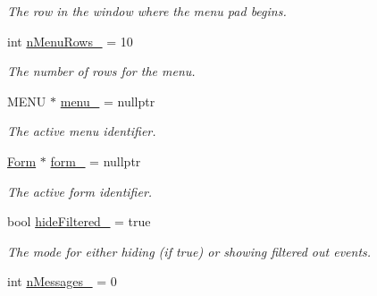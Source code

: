 \begin{DoxyCompactItemize}
\begin{DoxyCompactList}\small\item\em The row in the window where the menu pad begins. \end{DoxyCompactList}\item 
int \hyperlink{structslb_1_1core_1_1ui_1_1LogWindow_a7ebb18c261f95f0212997c48ae98878e}{n\+Menu\+Rows\+\_\+} = 10\hypertarget{structslb_1_1core_1_1ui_1_1LogWindow_a7ebb18c261f95f0212997c48ae98878e}{}\label{structslb_1_1core_1_1ui_1_1LogWindow_a7ebb18c261f95f0212997c48ae98878e}

\begin{DoxyCompactList}\small\item\em The number of rows for the menu. \end{DoxyCompactList}\item 
M\+E\+NU $\ast$ \hyperlink{structslb_1_1core_1_1ui_1_1LogWindow_a3fcd52c1d0ee725005b353fca1568f2f}{menu\+\_\+} = nullptr\hypertarget{structslb_1_1core_1_1ui_1_1LogWindow_a3fcd52c1d0ee725005b353fca1568f2f}{}\label{structslb_1_1core_1_1ui_1_1LogWindow_a3fcd52c1d0ee725005b353fca1568f2f}

\begin{DoxyCompactList}\small\item\em The active menu identifier. \end{DoxyCompactList}\item 
\hyperlink{structslb_1_1core_1_1ui_1_1Form}{Form} $\ast$ \hyperlink{structslb_1_1core_1_1ui_1_1LogWindow_a6fb5c4f0ca6cfd0c318abed3f142e073}{form\+\_\+} = nullptr\hypertarget{structslb_1_1core_1_1ui_1_1LogWindow_a6fb5c4f0ca6cfd0c318abed3f142e073}{}\label{structslb_1_1core_1_1ui_1_1LogWindow_a6fb5c4f0ca6cfd0c318abed3f142e073}

\begin{DoxyCompactList}\small\item\em The active form identifier. \end{DoxyCompactList}\item 
bool \hyperlink{structslb_1_1core_1_1ui_1_1LogWindow_a538ca4478f0ea842362b6754f8c80e22}{hide\+Filtered\+\_\+} = true\hypertarget{structslb_1_1core_1_1ui_1_1LogWindow_a538ca4478f0ea842362b6754f8c80e22}{}\label{structslb_1_1core_1_1ui_1_1LogWindow_a538ca4478f0ea842362b6754f8c80e22}

\begin{DoxyCompactList}\small\item\em The mode for either hiding (if {\ttfamily true}) or showing filtered out events. \end{DoxyCompactList}\item 
int \hyperlink{structslb_1_1core_1_1ui_1_1LogWindow_a9faf4b6f0734aeba24b2651e82a34e96}{n\+Messages\+\_\+} = 0\hypertarget{structslb_1_1core_1_1ui_1_1LogWindow_a9faf4b6f0734aeba24b2651e82a34e96}{}\label{structslb_1_1core_1_1ui_1_1LogWindow_a9faf4b6f0734aeba24b2651e82a34e96}


\end{DoxyCompactItemize}
